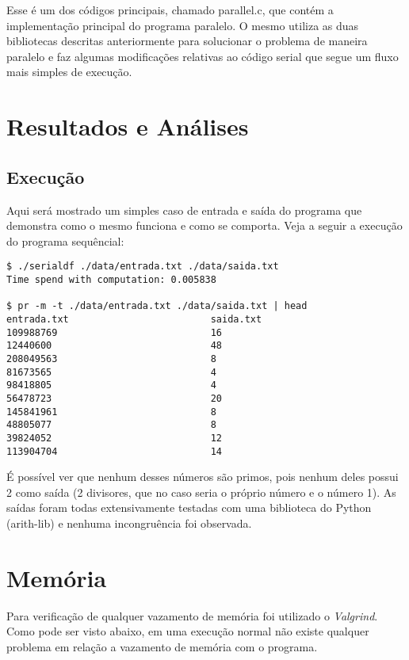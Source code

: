 \documentclass{article}
\begin{document}
Esse é um dos códigos principais, chamado parallel.c, que contém a implementação principal do programa paralelo. O mesmo utiliza as duas bibliotecas descritas anteriormente para solucionar o problema de maneira paralelo e faz algumas modificações relativas ao código serial que segue um fluxo mais simples de execução.

\section{Resultados e Análises}
\subsection{Execução}

Aqui será mostrado um simples caso de entrada e saída do programa que demonstra como o mesmo funciona e como se comporta. Veja a seguir a execução do programa sequêncial:

\begin{verbatim}
$ ./serialdf ./data/entrada.txt ./data/saida.txt  
Time spend with computation: 0.005838

$ pr -m -t ./data/entrada.txt ./data/saida.txt | head
entrada.txt                         saida.txt
109988769                           16
12440600                            48
208049563                           8
81673565                            4
98418805                            4
56478723                            20
145841961                           8
48805077                            8
39824052                            12
113904704                           14
\end{verbatim}

É possível ver que nenhum desses números são primos, pois nenhum deles possui 2 como saída (2 divisores, que no caso seria o próprio número e o número 1). As saídas foram todas extensivamente testadas com uma biblioteca do Python (arith-lib) e nenhuma incongruência foi observada.

\section{Memória}

Para verificação de qualquer vazamento de memória foi utilizado o \textit{Valgrind}. Como pode ser visto abaixo, em uma execução normal não existe qualquer problema em relação a vazamento de memória com o programa.
\end{document}
